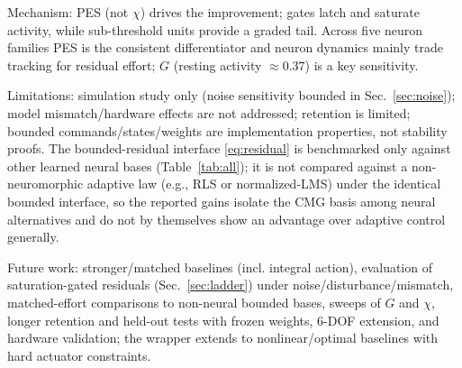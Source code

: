 \documentclass[letterpaper, 10 pt, conference]{ieeeconf}
\newcommand{\clip}{\operatorname{clip}}
\begin{document}
Mechanism: PES (not $\chi$) drives the improvement; gates latch and saturate activity, while sub-threshold units provide a graded tail. Across five neuron families PES is the consistent differentiator and neuron dynamics mainly trade tracking for residual effort; $G$ (resting activity $\approx0.37$) is a key sensitivity.

Limitations: simulation study only (noise sensitivity bounded in Sec.~\ref{sec:noise}); model mismatch/hardware effects are not addressed; retention is limited; bounded commands/states/weights are implementation properties, not stability proofs. The bounded-residual interface \eqref{eq:residual} is benchmarked only against other learned neural bases (Table~\ref{tab:all}); it is not compared against a non-neuromorphic adaptive law (e.g., RLS or normalized-LMS) under the identical bounded interface, so the reported gains isolate the CMG basis among neural alternatives and do not by themselves show an advantage over adaptive control generally.

Future work: stronger/matched baselines (incl. integral action), evaluation of saturation-gated residuals (Sec.~\ref{sec:ladder}) under noise/disturbance/mismatch, matched-effort comparisons to non-neural bounded bases, sweeps of $G$ and $\chi$, longer retention and held-out tests with frozen weights, 6-DOF extension, and hardware validation; the wrapper extends to nonlinear/optimal baselines with hard actuator constraints.


\end{document}

